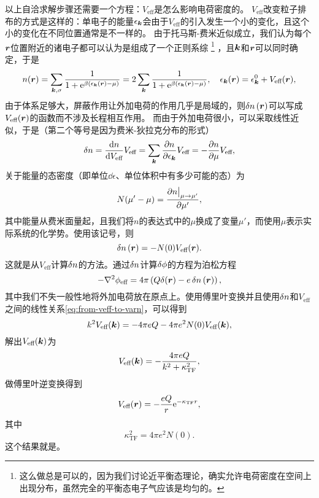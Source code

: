 以上自洽求解步骤还需要一个方程：$V_\text{eff}$是怎么影响电荷密度的。
$V_\text{eff}$改变粒子排布的方式是这样的：单电子的能量$\epsilon_{\vb*{k}}$会由于$V_\text{eff}$的引入发生一个小的变化，且这个小的变化在不同位置通常是不一样的。
由于托马斯-费米近似成立，我们认为每个$\vb*{r}$位置附近的诸电子都可以认为是组成了一个正则系综%
\footnote{这么做总是可以的，因为我们讨论近平衡态理论，确实允许电荷密度在空间上出现分布，虽然完全的平衡态电子气应该是均匀的。}%
，且$\vb*{k}$和$\vb*{r}$可以同时确定，于是
\[
    n(\vb*{r}) = \sum_{\vb*{k}, \sigma} \frac{1}{1 + \mathrm{e}^{\beta (\epsilon_{\vb*{k}}(\vb*{r}) - \mu)}} = 2 \sum_{\vb*{k}} \frac{1}{1 + \mathrm{e}^{\beta (\epsilon_{\vb*{k}}(\vb*{r}) - \mu)}}, \quad \epsilon_{\vb*{k}}(\vb*{r}) = \epsilon_{\vb*{k}}^0 + V_\text{eff}(\vb*{r}),
\]
由于体系足够大，屏蔽作用让外加电荷的作用几乎是局域的，则$\var{n}(\vb*{r})$可以写成$V_\text{eff}(\vb*{r})$的函数而不涉及长程相互作用。
而由于外加电荷很小，可以采取线性近似，于是（第二个等号是因为费米-狄拉克分布的形式）
\[
    \var{n} = \dv{n}{V_\text{eff}} V_\text{eff} = \sum_{\vb*{k}} \pdv{n}{\epsilon_{\vb*{k}}} V_\text{eff} = - \pdv{n}{\mu} V_\text{eff},
\]
关于能量的态密度（即单位$\dd{\epsilon}$、单位体积中有多少可能的态）为
\begin{equation}
    N(\mu' - \mu) = \pdv{n\big|_{\mu \to \mu'}}{\mu'},
\end{equation}
其中能量从费米面量起，且我们将$n$的表达式中的$\mu$换成了变量$\mu'$，而使用$\mu$表示实际系统的化学势。使用该记号，则
\begin{equation}
    \var{n}(\vb*{r}) = - N(0) V_\text{eff}(\vb*{r}).
    \label{eq:from-veff-to-varn}
\end{equation}
这就是从$V_\text{eff}$计算$\var{n}$的方法。通过$\var{n}$计算$\var{\phi}$的方程为泊松方程
\[
    - \laplacian \phi_\text{eff} = 4 \pi \left( Q \delta(\vb*{r}) - e \var{n}(\vb*{r}) \right),
\]
其中我们不失一般性地将外加电荷放在原点上。使用傅里叶变换并且使用$\var{n}$和$V_\text{eff}$之间的线性关系\eqref{eq:from-veff-to-varn}，可以得到
\[
    k^2 V_\text{eff}(\vb*{k}) = - 4\pi e Q - 4 \pi e^2 N(0) V_\text{eff}(\vb*{k}),
\]
解出$V_\text{eff}(\vb*{k})$为
\[
    V_\text{eff}(\vb*{k}) = - \frac{4 \pi e Q}{k^2 + \kappa
    _\text{TF}^2},
\]
做傅里叶逆变换得到
\begin{equation}
    V_\text{eff}(\vb*{r}) = - \frac{eQ}{r} \mathrm{e}^{- \kappa_\text{TF} r},
    \label{eq:thomas-fermi-potential}
\end{equation}
其中
\begin{equation}
    \kappa_\text{TF}^2 = 4 \pi e^2 N(0).
\end{equation}
这个结果就是。

